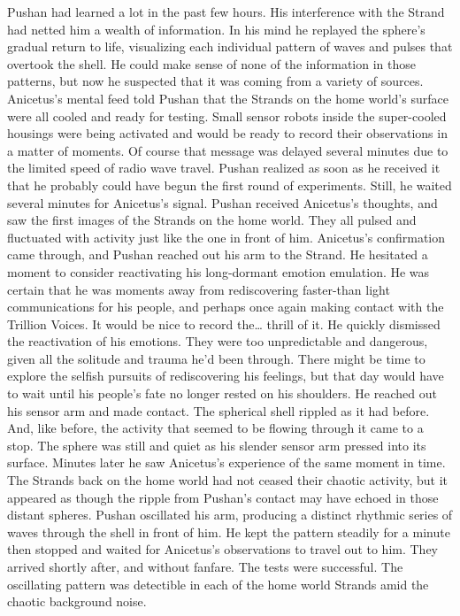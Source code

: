 \documentclass[a4paper]{article}
\begin{document}
Pushan had learned a lot in the past few hours. His interference with the Strand had netted him a wealth of information. In his mind he replayed the sphere’s gradual return to life, visualizing each individual pattern of waves and pulses that overtook the shell. He could make sense of none of the information in those patterns, but now he suspected that it was coming from a variety of sources.
Anicetus’s mental feed told Pushan that the Strands on the home world’s surface were all cooled and ready for testing. Small sensor robots inside the super-cooled housings were being activated and would be ready to record their observations in a matter of moments.
Of course that message was delayed several minutes due to the limited speed of radio wave travel. Pushan realized as soon as he received it that he probably could have begun the first round of experiments. Still, he waited several minutes for Anicetus’s signal.
Pushan received Anicetus’s thoughts, and saw the first images of the Strands on the home world. They all pulsed and fluctuated with activity just like the one in front of him. Anicetus’s confirmation came through, and Pushan reached out his arm to the Strand. He hesitated a moment to consider reactivating his long-dormant emotion emulation. He was certain that he was moments away from rediscovering faster-than light communications for his people, and perhaps once again making contact with the Trillion Voices. It would be nice to record the… thrill of it.
He quickly dismissed the reactivation of his emotions. They were too unpredictable and dangerous, given all the solitude and trauma he’d been through. There might be time to explore the selfish pursuits of rediscovering his feelings, but that day would have to wait until his people’s fate no longer rested on his shoulders. He reached out his sensor arm and made contact.
The spherical shell rippled as it had before. And, like before, the activity that seemed to be flowing through it came to a stop. The sphere was still and quiet as his slender sensor arm pressed into its surface.
Minutes later he saw Anicetus’s experience of the same moment in time. The Strands back on the home world had not ceased their chaotic activity, but it appeared as though the ripple from Pushan’s contact may have echoed in those distant spheres.
Pushan oscillated his arm, producing a distinct rhythmic series of waves through the shell in front of him. He kept the pattern steadily for a minute then stopped and waited for Anicetus’s observations to travel out to him. They arrived shortly after, and without fanfare. The tests were successful. The oscillating pattern was detectible in each of the home world Strands amid the chaotic background noise.
\end{document}
